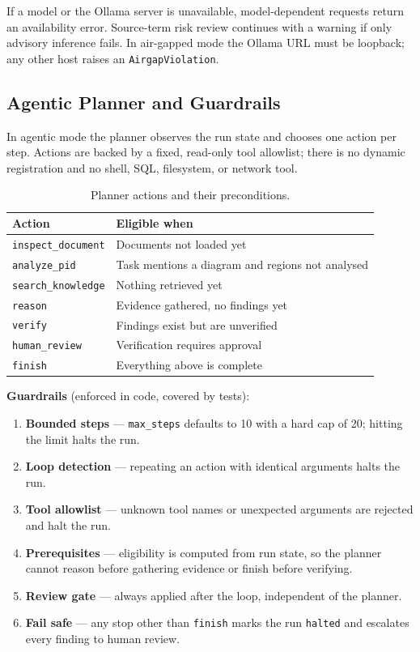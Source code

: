 \documentclass[11pt,a4paper]{article}
\begin{document}
\noindent If a model or the Ollama server is unavailable, model-dependent requests return an availability error. Source-term risk review continues with a warning if only advisory inference fails. In air-gapped
mode the Ollama URL must be loopback; any other host raises an
\texttt{AirgapViolation}.

\subsection{Agentic Planner and Guardrails}
In agentic mode the planner observes the run state and chooses one action per
step. Actions are backed by a fixed, read-only tool allowlist; there is no
dynamic registration and no shell, SQL, filesystem, or network tool.

\begin{table}[htbp]
\centering
\small
\begin{tabular}{@{}p{3.6cm} p{10.6cm}@{}}
\toprule
\textbf{Action} & \textbf{Eligible when} \\
\midrule
\texttt{inspect\_document} & Documents not loaded yet \\
\texttt{analyze\_pid} & Task mentions a diagram and regions not analysed \\
\texttt{search\_knowledge} & Nothing retrieved yet \\
\texttt{reason} & Evidence gathered, no findings yet \\
\texttt{verify} & Findings exist but are unverified \\
\texttt{human\_review} & Verification requires approval \\
\texttt{finish} & Everything above is complete \\
\bottomrule
\end{tabular}
\caption{Planner actions and their preconditions.}
\end{table}

\noindent\textbf{Guardrails} (enforced in code, covered by tests):
\begin{enumerate}[leftmargin=1.4em]
  \item \textbf{Bounded steps} --- \texttt{max\_steps} defaults to 10 with a
        hard cap of 20; hitting the limit halts the run.
  \item \textbf{Loop detection} --- repeating an action with identical
        arguments halts the run.
  \item \textbf{Tool allowlist} --- unknown tool names or unexpected arguments
        are rejected and halt the run.
  \item \textbf{Prerequisites} --- eligibility is computed from run state, so
        the planner cannot reason before gathering evidence or finish before
        verifying.
  \item \textbf{Review gate} --- always applied after the loop, independent of
        the planner.
  \item \textbf{Fail safe} --- any stop other than \texttt{finish} marks the
        run \texttt{halted} and escalates every finding to human review.
\end{enumerate}
\end{document}
